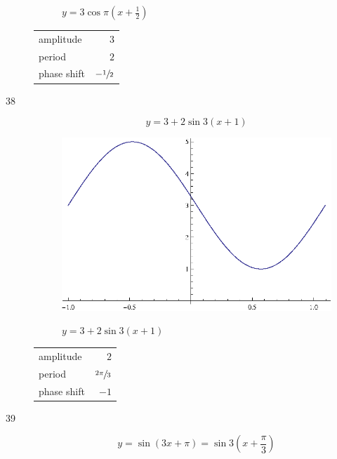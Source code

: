 \documentclass{exam}
\begin{document}
\begin{description}
\begin{figure}[H]
          $y = 3 \cos \pi \left( x + \frac{1}{2} \right)$
        \end{figure}

        \begin{tabular}[H]{lr}
          \toprule
          amplitude   & $3$ \\
          period      & $2$ \\
          phase shift & $- \sfrac{1}{2}$ \\
          \bottomrule
        \end{tabular}

      \pagebreak

      \item[38]
        \[
          y = 3 + 2 \sin 3 \left( x + 1 \right) 
        \]

        \begin{figure}[H]
          \centering
          \includegraphics[scale=1.0]{exercise38.eps}

          $y = 3 + 2 \sin 3 \left( x + 1 \right)$
        \end{figure}

        \begin{tabular}[H]{lr}
          \toprule
          amplitude   & $2$ \\
          period      & $\sfrac{2 \pi}{3}$ \\
          phase shift & $-1$ \\
          \bottomrule
        \end{tabular}

      \pagebreak

      \item[39]
        \[
          y = \sin \left( 3x + \pi \right) = \sin 3 \left( x + \frac{\pi}{3} \right) 
        \]


\end{description}
\end{document}
